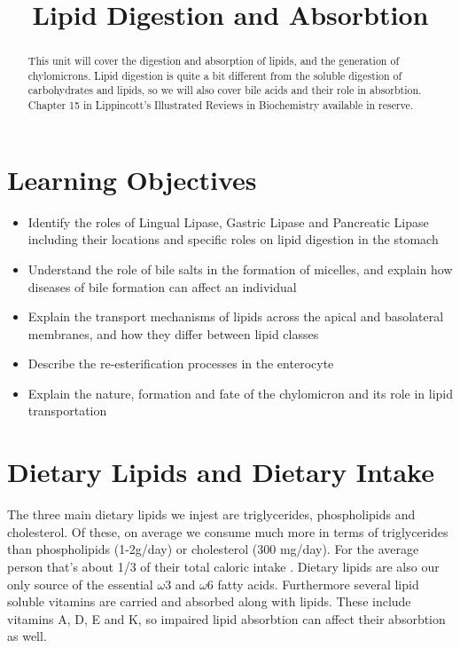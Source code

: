 \documentclass{tufte-handout}
\title{Lipid Digestion and Absorbtion}
\author{}
\date{}  %
\begin{document}
\maketitle%

\begin{abstract}
\noindent This unit will cover the digestion and absorption of lipids, and the generation of chylomicrons.  Lipid digestion is quite a bit different from the soluble digestion of carbohydrates and lipids, so we will also cover bile acids and their role in absorbtion.  Chapter 15 in Lippincott's Illustrated Reviews in Biochemistry available in reserve\cite{Ferrier2017}.
\end{abstract}

\tableofcontents

\pagebreak
\section{Learning Objectives}

\begin{itemize}
\item Identify the roles of Lingual Lipase, Gastric Lipase and Pancreatic Lipase including their locations and specific roles on lipid digestion in the stomach
\item Understand the role of bile salts in the formation of micelles, and explain how diseases of bile formation can affect an individual
\item Explain the transport mechanisms of lipids across the apical and basolateral membranes, and how they differ between lipid classes
\item Describe the re-esterification processes in the enterocyte
\item Explain the nature, formation and fate of the chylomicron and its role in lipid transportation



\end{itemize}

\section{Dietary Lipids and Dietary Intake}

The three main dietary lipids we injest are triglycerides, phospholipids and cholesterol.  Of these, on average we consume much more in terms of triglycerides than phospholipids (1-2g/day) or cholesterol (300 mg/day).  For the average person that's about 1/3 of their total caloric intake \citep{NationalCenterforHealthStatistics2017}.  Dietary lipids are also our only source of the essential $\omega$3 and $\omega$6 fatty acids.  Furthermore several lipid soluble vitamins are carried and absorbed along with lipids.  These include vitamins A, D, E and K, so impaired lipid absorbtion can affect their absorbtion as well.
\end{document}
